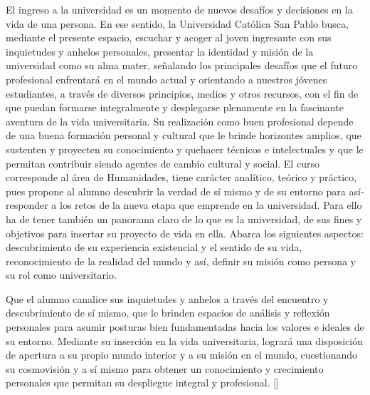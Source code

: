 \begin{syllabus}


\begin{justification}
El ingreso a la universidad es un momento de nuevos desafíos y decisiones en la vida de una persona. En ese sentido, la Universidad Católica San Pablo busca, mediante el presente espacio, escuchar y acoger al joven ingresante con sus inquietudes y anhelos personales, presentar la identidad y misión de la universidad como su alma mater, señalando los principales desafíos que el futuro profesional enfrentará en el mundo actual  y orientando a nuestros jóvenes estudiantes, a través de diversos principios, medios y otros recursos, con el fin de que puedan formarse integralmente y desplegarse plenamente en la fascinante aventura de la vida universitaria.  Su realización como buen profesional depende de una buena formación personal y cultural que le brinde horizontes amplios, que sustenten y proyecten su conocimiento y quehacer técnicos e intelectuales y que le permitan contribuir siendo agentes de cambio cultural y social.
El curso corresponde al área de Humanidades, tiene carácter analítico, teórico y práctico, pues propone al alumno descubrir  la verdad de sí­ mismo y de su entorno para así­ responder a los retos de la nueva etapa que emprende en la universidad. Para ello ha de tener también un panorama claro de lo que es la universidad, de sus fines y objetivos para insertar su proyecto de vida en ella. Abarca los siguientes aspectos:   descubrimiento de su experiencia existencial y el sentido de su vida, reconocimiento de la realidad del mundo y así­, definir su misión como persona y  su rol como universitario.
\end{justification}

\begin{goals}
\item Que el alumno canalice sus inquietudes y anhelos a través del encuentro y descubrimiento de sí­ mismo, que le brinden espacios de análisis y reflexión personales para asumir posturas bien fundamentadas hacia los valores e ideales de su entorno. Mediante su inserción en la vida universitaria, logrará una disposición de apertura a su propio mundo interior y a su misión en el mundo, cuestionando su cosmovisión y a sí­ mismo para obtener un conocimiento y crecimiento personales que permitan su despliegue integral y profesional. [\Familiarity]
\end{goals}


\end{syllabus}

